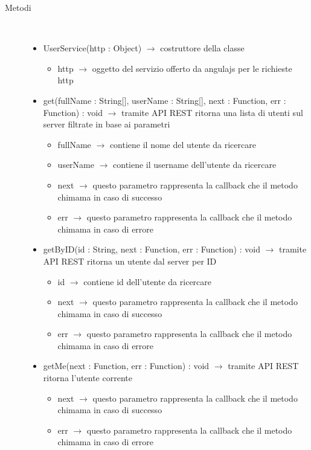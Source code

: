 \begin{description}
\item[Metodi] \hfill \\
\vspace{-7mm}
\begin{itemize}
	\item UserService(http : Object) $\rightarrow$ costruttore della classe\begin{itemize}
		\item http $\rightarrow$ oggetto del servizio offerto da angulajs per le richieste http
	\end{itemize}
	
	\item get(fullName : String[], userName : String[], next : Function, err : Function) : void $\rightarrow$ tramite API REST ritorna una lista di utenti sul server filtrate in base ai parametri\begin{itemize}
		\item fullName $\rightarrow$ contiene il nome del utente da ricercare 
		\item userName $\rightarrow$ contiene il username dell'utente da ricercare 
		\item next $\rightarrow$ questo parametro rappresenta la callback che il metodo chimama in caso di successo
		\item err $\rightarrow$ questo parametro rappresenta la callback che il metodo chimama in caso di errore
	\end{itemize}
	
	\item getByID(id : String, next : Function, err : Function) : void $\rightarrow$ tramite API REST ritorna un utente dal server per ID\begin{itemize}
		\item id $\rightarrow$ contiene id dell'utente da ricercare 
		\item next $\rightarrow$ questo parametro rappresenta la callback che il metodo chimama in caso di successo
		\item err $\rightarrow$ questo parametro rappresenta la callback che il metodo chimama in caso di errore
	\end{itemize}
	
	\item getMe(next : Function, err : Function) : void $\rightarrow$ tramite API REST ritorna l'utente corrente\begin{itemize}
		\item next $\rightarrow$ questo parametro rappresenta la callback che il metodo chimama in caso di successo
		\item err $\rightarrow$ questo parametro rappresenta la callback che il metodo chimama in caso di errore
	\end{itemize}
	

\end{itemize}
\end{description}
